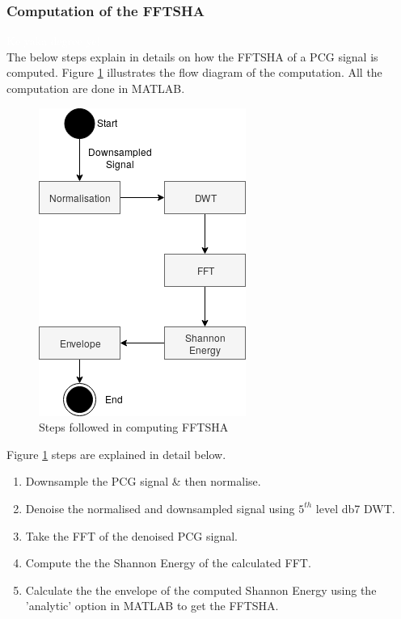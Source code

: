\documentclass[10pt,twocolumn]{witseiepaper}
\begin{document}
\subsubsection{Computation of the FFTSHA}
\label{sec:fftsha}
\textcolor{white}{Ke yaka degree ye!}\\
The below steps explain in details on how the FFTSHA of a PCG signal is computed. Figure \ref{fig:fftsha} illustrates the flow diagram of the computation. All the computation are done in MATLAB.

\begin{figure}[h!]
    \centering
    \includegraphics[scale=0.6]{./fftsha.png}
    \caption{Steps followed in computing FFTSHA}
    \label{fig:fftsha}
\end{figure}{}

Figure \ref{fig:fftsha} steps are explained in detail below.
\begin{enumerate}
    \item Downsample the PCG signal \& then normalise.
    \item Denoise the normalised and downsampled signal using $5^{th}$ level db7 DWT.
    \item Take the FFT of the denoised PCG signal.
    \item Compute the the Shannon Energy of the calculated FFT.
    \item Calculate the the envelope of the computed Shannon Energy using the 'analytic' option in MATLAB to get the FFTSHA.
\end{enumerate}{}
\end{document}
